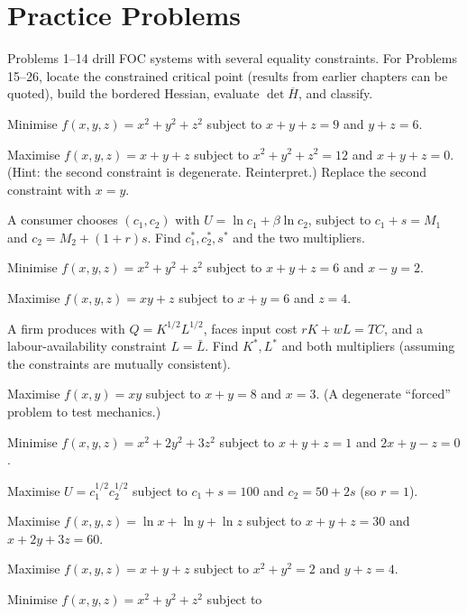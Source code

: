 \section{Practice Problems}

Problems 1--14 drill FOC systems with several equality constraints. For
Problems 15--26, locate the constrained critical point (results from
earlier chapters can be quoted), build the bordered Hessian, evaluate
$\det \overline{H}$, and classify.

\begin{problems}
  \item Minimise $f(x, y, z) = x^2 + y^2 + z^2$ subject to $x + y + z = 9$
        and $y + z = 6$.
  \item Maximise $f(x, y, z) = x + y + z$ subject to
        $x^2 + y^2 + z^2 = 12$ and $x + y + z = 0$. (Hint: the second
        constraint is degenerate. Reinterpret.) Replace the second
        constraint with $x = y$.
  \item A consumer chooses $(c_1, c_2)$ with
        $U = \ln c_1 + \beta \ln c_2$, subject to $c_1 + s = M_1$ and
        $c_2 = M_2 + (1 + r) s$. Find $c_1^*, c_2^*, s^*$ and the two
        multipliers.
  \item Minimise $f(x, y, z) = x^2 + y^2 + z^2$ subject to $x + y + z = 6$
        and $x - y = 2$.
  \item Maximise $f(x, y, z) = x y + z$ subject to $x + y = 6$ and
        $z = 4$.
  \item A firm produces with $Q = K^{1/2} L^{1/2}$, faces input cost
        $r K + w L = TC$, and a labour-availability constraint
        $L = \bar{L}$. Find $K^*, L^*$ and both multipliers (assuming the
        constraints are mutually consistent).
  \item Maximise $f(x, y) = x y$ subject to $x + y = 8$ and $x = 3$. (A
        degenerate ``forced'' problem to test mechanics.)
  \item Minimise $f(x, y, z) = x^2 + 2 y^2 + 3 z^2$ subject to
        $x + y + z = 1$ and $2 x + y - z = 0$.
  \item Maximise $U = c_1^{1/2} c_2^{1/2}$ subject to $c_1 + s = 100$ and
        $c_2 = 50 + 2 s$ (so $r = 1$).
  \item Maximise $f(x, y, z) = \ln x + \ln y + \ln z$ subject to
        $x + y + z = 30$ and $x + 2 y + 3 z = 60$.
  \item Maximise $f(x, y, z) = x + y + z$ subject to $x^2 + y^2 = 2$ and
        $y + z = 4$.
  \item Minimise $f(x, y, z) = x^2 + y^2 + z^2$ subject to

\end{problems}
